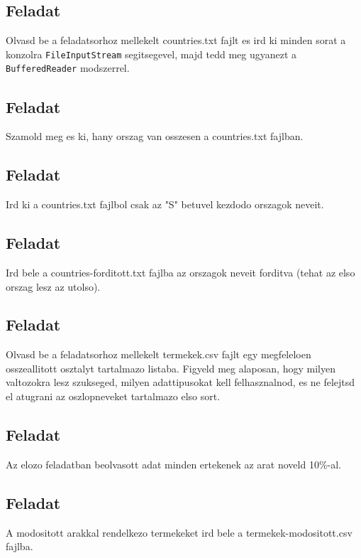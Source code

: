 \documentclass{article}
\let\l\lstinline
\begin{document}
\subsection{Feladat}

Olvasd be a feladatsorhoz mellekelt countries.txt fajlt es ird ki minden sorat a konzolra \l{FileInputStream} segitsegevel, majd tedd meg ugyanezt a \l{BufferedReader} modszerrel.

\subsection{Feladat}

Szamold meg es ki, hany orszag van osszesen a countries.txt fajlban.

\subsection{Feladat}

Ird ki a countries.txt fajlbol csak az "S" betuvel kezdodo orszagok neveit.

\subsection{Feladat}

Ird bele a countries-forditott.txt fajlba az orszagok neveit forditva (tehat az elso orszag lesz az utolso).

\subsection{Feladat}

Olvasd be a feladatsorhoz mellekelt termekek.csv fajlt egy megfeleloen osszeallitott osztalyt tartalmazo listaba. Figyeld meg alaposan, hogy milyen valtozokra lesz szukseged, milyen adattipusokat kell felhasznalnod, es ne felejtsd el atugrani az oszlopneveket tartalmazo elso sort.

\subsection{Feladat}

Az elozo feladatban beolvasott adat minden ertekenek az arat noveld 10\%-al.

\subsection{Feladat}

A modositott arakkal rendelkezo termekeket ird bele a termekek-modositott.csv fajlba.
    
\end{document}

